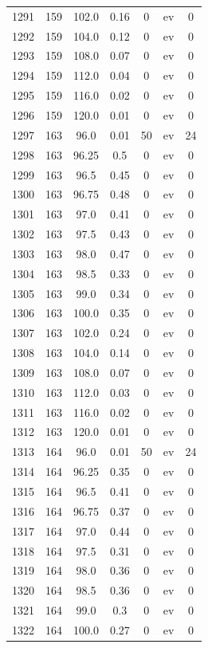\documentclass[12pt,a4paper]{article}
\begin{document}
\begin{tabular}{r|cccccc}
	1291 & 159 & 102.0 & 0.16 & 0 & ev & 0 \\
	1292 & 159 & 104.0 & 0.12 & 0 & ev & 0 \\
	1293 & 159 & 108.0 & 0.07 & 0 & ev & 0 \\
	1294 & 159 & 112.0 & 0.04 & 0 & ev & 0 \\
	1295 & 159 & 116.0 & 0.02 & 0 & ev & 0 \\
	1296 & 159 & 120.0 & 0.01 & 0 & ev & 0 \\
	1297 & 163 & 96.0 & 0.01 & 50 & ev & 24 \\
	1298 & 163 & 96.25 & 0.5 & 0 & ev & 0 \\
	1299 & 163 & 96.5 & 0.45 & 0 & ev & 0 \\
	1300 & 163 & 96.75 & 0.48 & 0 & ev & 0 \\
	1301 & 163 & 97.0 & 0.41 & 0 & ev & 0 \\
	1302 & 163 & 97.5 & 0.43 & 0 & ev & 0 \\
	1303 & 163 & 98.0 & 0.47 & 0 & ev & 0 \\
	1304 & 163 & 98.5 & 0.33 & 0 & ev & 0 \\
	1305 & 163 & 99.0 & 0.34 & 0 & ev & 0 \\
	1306 & 163 & 100.0 & 0.35 & 0 & ev & 0 \\
	1307 & 163 & 102.0 & 0.24 & 0 & ev & 0 \\
	1308 & 163 & 104.0 & 0.14 & 0 & ev & 0 \\
	1309 & 163 & 108.0 & 0.07 & 0 & ev & 0 \\
	1310 & 163 & 112.0 & 0.03 & 0 & ev & 0 \\
	1311 & 163 & 116.0 & 0.02 & 0 & ev & 0 \\
	1312 & 163 & 120.0 & 0.01 & 0 & ev & 0 \\
	1313 & 164 & 96.0 & 0.01 & 50 & ev & 24 \\
	1314 & 164 & 96.25 & 0.35 & 0 & ev & 0 \\
	1315 & 164 & 96.5 & 0.41 & 0 & ev & 0 \\
	1316 & 164 & 96.75 & 0.37 & 0 & ev & 0 \\
	1317 & 164 & 97.0 & 0.44 & 0 & ev & 0 \\
	1318 & 164 & 97.5 & 0.31 & 0 & ev & 0 \\
	1319 & 164 & 98.0 & 0.36 & 0 & ev & 0 \\
	1320 & 164 & 98.5 & 0.36 & 0 & ev & 0 \\
	1321 & 164 & 99.0 & 0.3 & 0 & ev & 0 \\
	1322 & 164 & 100.0 & 0.27 & 0 & ev & 0 \\

\end{tabular}
\end{document}
